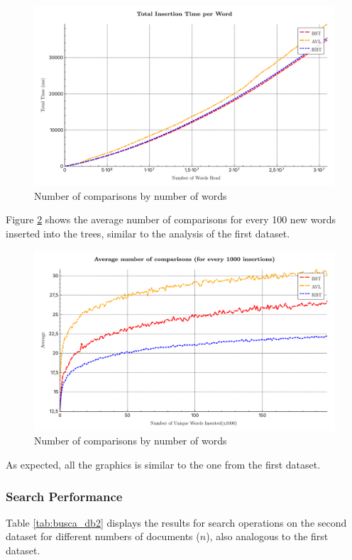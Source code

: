  \begin{figure}[H]
     \centering
     \includegraphics[width=0.8\linewidth]{img/Graph_4_199865.pdf}
     \caption{Number of comparisons by number of words}
     \label{fig:cumulativedist2}
 \end{figure}
Figure \ref{fig:mean-log2} shows the average number of comparisons for every 100 new words 
inserted into the trees, similar to the analysis of the first dataset.
\begin{figure}[H]
     \centering
     \includegraphics[width=0.8\linewidth]{img/Graph_3_199865.pdf}
     \caption{Number of comparisons by number of words}
     \label{fig:mean-log2}
\end{figure}

As expected, all the graphics is similar to the one from the first dataset.

 \subsubsection{Search Performance}

 Table \ref{tab:busca_db2} displays the results for search operations on the second dataset for different numbers
 of documents ($n$), also analogous to the first dataset.

